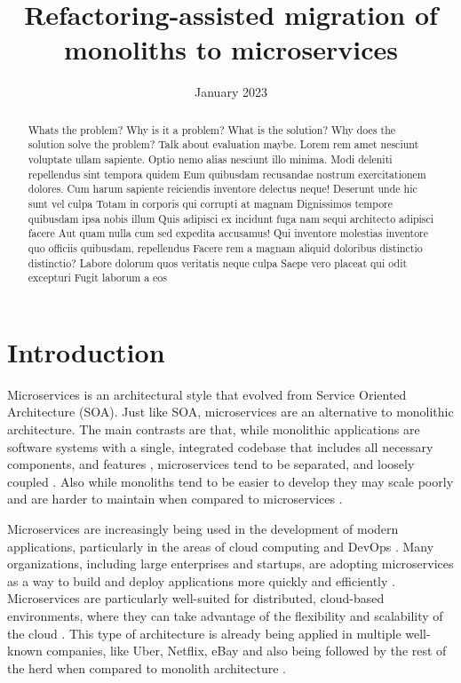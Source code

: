 \documentclass[conference]{IEEEtran}
\title{Refactoring-assisted migration of monoliths to microservices}
\author{
  \IEEEauthorblockN{Breno Salles}
  \IEEEauthorblockA{
    \textit{Faculty of Engineering} \\
    \textit{University of Porto}\\
    Porto, Portugal \\
    up202103389@fe.up.pt
  }
}
\date{January 2023}
\begin{document}
\maketitle

\begin{abstract}

Whats the problem?
Why is it a problem?
What is the solution?
Why does the solution solve the problem? Talk about evaluation maybe.
  Lorem rem amet nesciunt voluptate ullam sapiente. Optio nemo alias nesciunt
  illo minima. Modi deleniti repellendus sint tempora quidem Eum quibusdam
  recusandae nostrum exercitationem dolores. Cum harum sapiente reiciendis
  inventore delectus neque! Deserunt unde hic sunt vel culpa Totam in corporis
  qui corrupti at magnam Dignissimos tempore quibusdam ipsa nobis illum Quis
  adipisci ex incidunt fuga nam sequi architecto adipisci facere Aut quam nulla
  cum sed expedita accusamus! Qui inventore molestias inventore quo officiis
  quibusdam, repellendus Facere rem a magnam aliquid doloribus distinctio
  distinctio? Labore dolorum quos veritatis neque culpa Saepe vero placeat qui
  odit excepturi Fugit laborum a eos

\end{abstract}

\section{Introduction} \label{sec:introduction}

Microservices is an architectural style that evolved from Service Oriented
Architecture (SOA). Just like SOA, microservices are an alternative to
monolithic architecture. The main contrasts are that, while monolithic
applications are software systems with a single, integrated codebase that
includes all necessary components, and features
\cite{kazanavivcius2019migrating}, microservices tend to be separated, and
loosely coupled \cite{newman2021building}. Also while monoliths tend to be
easier to develop they may scale poorly and are harder to maintain when
compared to microservices \cite{newman2019monolith}.

Microservices are increasingly being used in the development of modern
applications, particularly in the areas of cloud computing and DevOps
\cite{ren2018migrating}. Many organizations, including large enterprises and
startups, are adopting microservices as a way to build and deploy applications
more quickly and efficiently \cite{richardson-microservices}. Microservices are
particularly well-suited for distributed, cloud-based environments, where they
can take advantage of the flexibility and scalability of the cloud
\cite{fowler-microservices-prerequisites}. This type of architecture is already
being applied in multiple well-known companies, like Uber, Netflix, eBay
\cite{microservices-users} and also being followed by the rest of the herd when
compared to monolith architecture \cite{taibi2017processes}.
\end{document}
